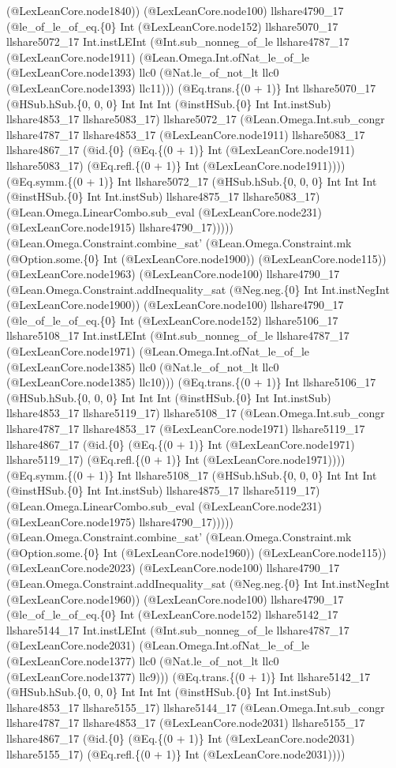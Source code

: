\documentclass[11pt]{article}
\begin{document}
(@LexLeanCore.node1840)) (@LexLeanCore.node100) llshare4790\_17 (@le\_of\_le\_of\_eq.\{0\} Int (@LexLeanCore.node152) llshare5070\_17 llshare5072\_17 Int.instLEInt (@Int.sub\_nonneg\_of\_le llshare4787\_17 (@LexLeanCore.node1911) (@Lean.Omega.Int.ofNat\_le\_of\_le (@LexLeanCore.node1393) llc0 (@Nat.le\_of\_not\_lt llc0 (@LexLeanCore.node1393) llc11))) (@Eq.trans.\{(0 + 1)\} Int llshare5070\_17 (@HSub.hSub.\{0, 0, 0\} Int Int Int (@instHSub.\{0\} Int Int.instSub) llshare4853\_17 llshare5083\_17) llshare5072\_17 (@Lean.Omega.Int.sub\_congr llshare4787\_17 llshare4853\_17 (@LexLeanCore.node1911) llshare5083\_17 llshare4867\_17 (@id.\{0\} (@Eq.\{(0 + 1)\} Int (@LexLeanCore.node1911) llshare5083\_17) (@Eq.refl.\{(0 + 1)\} Int (@LexLeanCore.node1911)))) (@Eq.symm.\{(0 + 1)\} Int llshare5072\_17 (@HSub.hSub.\{0, 0, 0\} Int Int Int (@instHSub.\{0\} Int Int.instSub) llshare4875\_17 llshare5083\_17) (@Lean.Omega.LinearCombo.sub\_eval (@LexLeanCore.node231) (@LexLeanCore.node1915) llshare4790\_17))))) (@Lean.Omega.Constraint.combine\_sat' (@Lean.Omega.Constraint.mk (@Option.some.\{0\} Int (@LexLeanCore.node1900)) (@LexLeanCore.node115)) (@LexLeanCore.node1963) (@LexLeanCore.node100) llshare4790\_17 (@Lean.Omega.Constraint.addInequality\_sat (@Neg.neg.\{0\} Int Int.instNegInt (@LexLeanCore.node1900)) (@LexLeanCore.node100) llshare4790\_17 (@le\_of\_le\_of\_eq.\{0\} Int (@LexLeanCore.node152) llshare5106\_17 llshare5108\_17 Int.instLEInt (@Int.sub\_nonneg\_of\_le llshare4787\_17 (@LexLeanCore.node1971) (@Lean.Omega.Int.ofNat\_le\_of\_le (@LexLeanCore.node1385) llc0 (@Nat.le\_of\_not\_lt llc0 (@LexLeanCore.node1385) llc10))) (@Eq.trans.\{(0 + 1)\} Int llshare5106\_17 (@HSub.hSub.\{0, 0, 0\} Int Int Int (@instHSub.\{0\} Int Int.instSub) llshare4853\_17 llshare5119\_17) llshare5108\_17 (@Lean.Omega.Int.sub\_congr llshare4787\_17 llshare4853\_17 (@LexLeanCore.node1971) llshare5119\_17 llshare4867\_17 (@id.\{0\} (@Eq.\{(0 + 1)\} Int (@LexLeanCore.node1971) llshare5119\_17) (@Eq.refl.\{(0 + 1)\} Int (@LexLeanCore.node1971)))) (@Eq.symm.\{(0 + 1)\} Int llshare5108\_17 (@HSub.hSub.\{0, 0, 0\} Int Int Int (@instHSub.\{0\} Int Int.instSub) llshare4875\_17 llshare5119\_17) (@Lean.Omega.LinearCombo.sub\_eval (@LexLeanCore.node231) (@LexLeanCore.node1975) llshare4790\_17))))) (@Lean.Omega.Constraint.combine\_sat' (@Lean.Omega.Constraint.mk (@Option.some.\{0\} Int (@LexLeanCore.node1960)) (@LexLeanCore.node115)) (@LexLeanCore.node2023) (@LexLeanCore.node100) llshare4790\_17 (@Lean.Omega.Constraint.addInequality\_sat (@Neg.neg.\{0\} Int Int.instNegInt (@LexLeanCore.node1960)) (@LexLeanCore.node100) llshare4790\_17 (@le\_of\_le\_of\_eq.\{0\} Int (@LexLeanCore.node152) llshare5142\_17 llshare5144\_17 Int.instLEInt (@Int.sub\_nonneg\_of\_le llshare4787\_17 (@LexLeanCore.node2031) (@Lean.Omega.Int.ofNat\_le\_of\_le (@LexLeanCore.node1377) llc0 (@Nat.le\_of\_not\_lt llc0 (@LexLeanCore.node1377) llc9))) (@Eq.trans.\{(0 + 1)\} Int llshare5142\_17 (@HSub.hSub.\{0, 0, 0\} Int Int Int (@instHSub.\{0\} Int Int.instSub) llshare4853\_17 llshare5155\_17) llshare5144\_17 (@Lean.Omega.Int.sub\_congr llshare4787\_17 llshare4853\_17 (@LexLeanCore.node2031) llshare5155\_17 llshare4867\_17 (@id.\{0\} (@Eq.\{(0 + 1)\} Int (@LexLeanCore.node2031) llshare5155\_17) (@Eq.refl.\{(0 + 1)\} Int (@LexLeanCore.node2031)))) 
\end{document}
